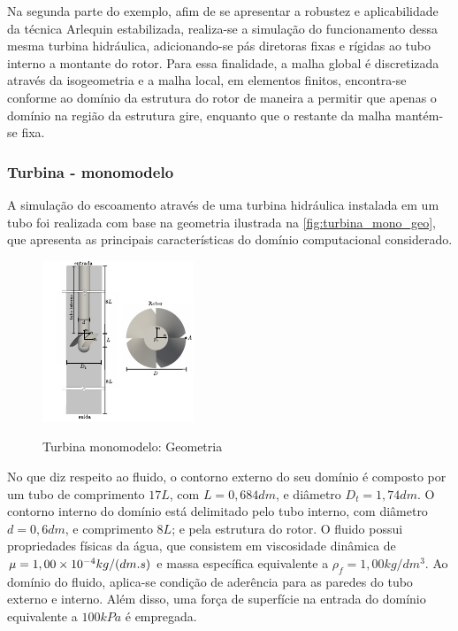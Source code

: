 Na segunda parte do exemplo, afim de se apresentar a robustez e aplicabilidade da técnica Arlequin estabilizada, realiza-se a simulação do funcionamento dessa mesma turbina hidráulica, adicionando-se pás diretoras fixas e rígidas ao tubo interno a montante do rotor. Para essa finalidade, a malha global é discretizada através da isogeometria e a malha local, em elementos finitos, encontra-se conforme ao domínio da estrutura do rotor de maneira a permitir que apenas o domínio na região da estrutura gire, enquanto que o restante da malha mantém-se fixa.   

\subsubsection{Turbina - monomodelo}\label{capitulo:Cap7:exemplos:Turbina:Mono}

A simulação do escoamento através de uma turbina hidráulica instalada em um tubo foi realizada com base na geometria ilustrada na \autoref{fig:turbina_mono_geo}, que apresenta as principais características do domínio computacional considerado.

\begin{figure}[!htbp]
	\caption{Turbina monomodelo: Geometria}
	\centering 
	\includegraphics[scale=3.0,trim=0cm 0cm 0cm 0cm, clip=true]{Imagens/Cap7/turbina_mono_geo.pdf}	
	\label{fig:turbina_mono_geo}
\end{figure}

No que diz respeito ao fluido, o contorno externo do seu domínio é composto por um tubo de comprimento $17L$, com $L = 0,684dm$, e diâmetro $D_t = 1,74dm$. O contorno interno do domínio está delimitado pelo tubo interno, com diâmetro $d = 0,6dm$, e comprimento $8L$; e pela estrutura do rotor. O fluido possui propriedades físicas da água, que consistem em viscosidade dinâmica de $\mu=1,00\times10^{-4} kg/(dm.s)$ e massa específica equivalente a $\rho_{f} = 1,00 kg/dm^3 $. Ao domínio do fluido, aplica-se condição de aderência para as paredes do tubo externo e interno. Além disso, uma força de superfície na entrada do domínio equivalente a $100kPa$ é empregada.

